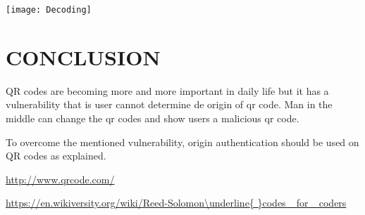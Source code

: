 \documentclass[12pt,journal,compsoc]{IEEEtran}
\begin{document}
\begin{center}
\texttt{[image: Decoding]}
\end{center}


\section{CONCLUSION}

QR codes are becoming more and more important in daily life but it has a vulnerability that is user cannot determine de origin of qr code. Man in the middle can change the qr codes and show users a malicious qr code.

To overcome the mentioned vulnerability, origin authentication should be used on QR codes as explained.

\begin{thebibliography}{1}


 \url{http://www.qrcode.com/}

 \url{https://en.wikiversity.org/wiki/Reed-Solomon\underline{ }codes\_ for\_ coders}


\end{thebibliography}
\end{document}
